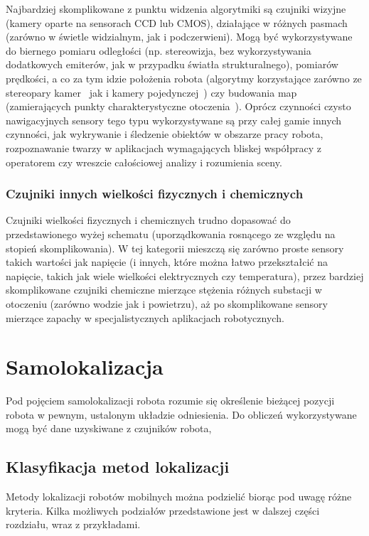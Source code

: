 Najbardziej skomplikowane z punktu widzenia algorytmiki są czujniki wizyjne
(kamery oparte na sensorach CCD lub CMOS), działające w różnych pasmach
(zarówno w świetle widzialnym, jak i podczerwieni). Mogą być wykorzystywane
do biernego pomiaru odległości (np. stereowizja, bez wykorzystywania dodatkowych
emiterów, jak w przypadku światła strukturalnego), pomiarów prędkości, 
a co za tym idzie położenia robota (algorytmy korzystające zarówno ze stereopary
kamer~\cite{vodom_stereo} jak i kamery pojedynczej~\cite{vodom_mono}) czy budowania
map (zamierających punkty charakterystyczne otoczenia~\cite{vslam}). Oprócz
czynności czysto nawigacyjnych sensory tego typu wykorzystywane są przy całej
gamie innych czynności, jak wykrywanie i śledzenie obiektów w obszarze pracy robota,
rozpoznawanie twarzy w aplikacjach wymagających bliskej współpracy z operatorem
czy wreszcie całościowej analizy i rozumienia sceny.

\subsubsection{Czujniki innych wielkości fizycznych i chemicznych}

Czujniki wielkości fizycznych i chemicznych trudno dopasować do przedstawionego
wyżej schematu (uporządkowania rosnącego ze względu na stopień skomplikowania).
W tej kategorii mieszczą się zarówno proste sensory takich wartości jak
napięcie (i innych, które można łatwo przekształcić na napięcie, takich jak 
wiele wielkości elektrycznych czy temperatura), przez bardziej skomplikowane
czujniki chemiczne mierzące stężenia różnych substacji w otoczeniu (zarówno
wodzie jak i powietrzu), aż po skomplikowane sensory mierzące zapachy
w specjalistycznych aplikacjach robotycznych.

\section{Samolokalizacja}

Pod pojęciem samolokalizacji robota rozumie się określenie bieżącej pozycji
robota w pewnym, ustalonym układzie odniesienia. Do obliczeń wykorzystywane mogą
być dane uzyskiwane z czujników robota, 

\subsection{Klasyfikacja metod lokalizacji}

Metody lokalizacji robotów mobilnych można podzielić biorąc pod uwagę różne
kryteria. Kilka możliwych podziałów przedstawione jest w dalszej części
rozdziału, wraz z przykładami.

